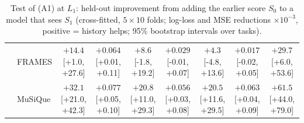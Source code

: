 \begin{table}[h]
{\begin{tabular}{@{}llccccccc@{}}
 & FRAMES & $+14.4$ {\scriptsize[+1.0, +27.6]} & $+0.064$ {\scriptsize[+0.01, +0.11]} & $+8.6$ {\scriptsize[-1.8, +19.2]} & $+0.029$ {\scriptsize[-0.01, +0.07]} & $+4.3$ {\scriptsize[-4.8, +13.6]} & $+0.017$ {\scriptsize[-0.02, +0.05]} & $+29.7$ {\scriptsize[+6.0, +53.6]} \\
 & MuSiQue & $+32.1$ {\scriptsize[+21.0, +42.3]} & $+0.077$ {\scriptsize[+0.05, +0.10]} & $+20.8$ {\scriptsize[+11.0, +29.3]} & $+0.056$ {\scriptsize[+0.03, +0.08]} & $+20.5$ {\scriptsize[+11.6, +29.5]} & $+0.063$ {\scriptsize[+0.04, +0.09]} & $+61.5$ {\scriptsize[+44.0, +79.0]} \\
\bottomrule
\end{tabular}}
\caption{Test of (A1) at $L_1$: held-out improvement from adding the earlier score $S_0$ to a model that sees $S_1$
(cross-fitted, $5 \times 10$ folds; log-loss and MSE reductions $\times 10^{-3}$, positive = history helps; 95\% bootstrap
intervals over tasks).}
\label{tab:a1}
\end{table}
